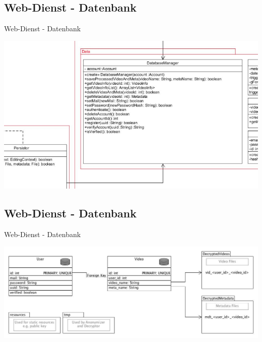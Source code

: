 \documentclass[19pt]{beamer}
\begin{document}
\subsection{Web-Dienst - Datenbank}
\begin{frame}{Web-Dienst - Datenbank}
\begin{center}
\includegraphics[scale=0.35]{resources/service_db.png}
\end{center}
\end{frame}
\subsection{Web-Dienst - Datenbank}
\begin{frame}{Web-Dienst - Datenbank}
\begin{center}
\includegraphics[scale=0.3]{resources/database_scheme.jpg}
\end{center}
\end{frame}
\end{document}
